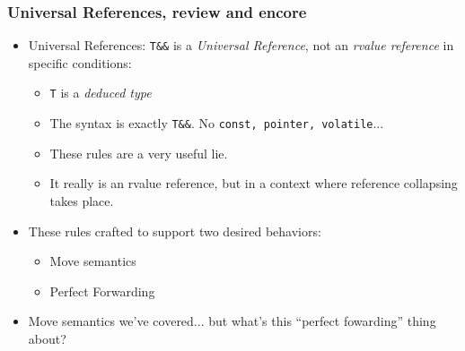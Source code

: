 
\begin{frame}[fragile,t]
\frametitle{Universal References, review and encore}
\begin{itemize}[<+->]
\item Universal References: \texttt{T\&\&} is a \emph{Universal
  Reference}, not an \emph{rvalue reference} in specific conditions:
  \begin{itemize}
    \item \texttt{T} is a \emph{deduced type}
    \item The syntax is exactly \texttt{T\&\&}.  No \texttt{const,
      pointer, volatile}... 
    \item These rules are a very useful lie.  
    \item It really is an rvalue reference, but in a context where
      reference collapsing takes place.
  \end{itemize}
\item These rules crafted to support two desired behaviors:
  \begin{itemize}
  \item Move semantics
  \item Perfect Forwarding
  \end{itemize}
\item Move semantics we've covered... but what's this ``perfect
  fowarding'' thing about?
\end{itemize}
\end{frame}


